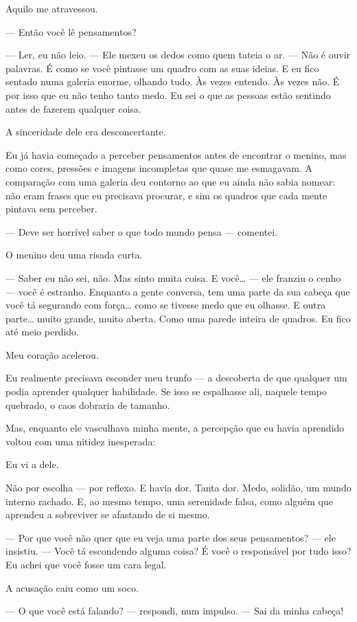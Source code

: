 Aquilo me atravessou.

— Então você lê pensamentos?

— Ler, eu não leio. — Ele mexeu os dedos como quem tateia o ar. — Não é ouvir palavras. É como se você pintasse um quadro com as suas ideias. E eu fico sentado numa galeria enorme, olhando tudo. Às vezes entendo. Às vezes não.  
É por isso que eu não tenho tanto medo. Eu sei o que as pessoas estão sentindo antes de fazerem qualquer coisa.

A sinceridade dele era desconcertante.

Eu já havia começado a perceber pensamentos antes de encontrar o menino, mas como cores, pressões e imagens incompletas que quase me esmagavam. A comparação com uma galeria deu contorno ao que eu ainda não sabia nomear: não eram frases que eu precisava procurar, e sim os quadros que cada mente pintava sem perceber.

— Deve ser horrível saber o que todo mundo pensa — comentei.

O menino deu uma risada curta.

— Saber eu não sei, não. Mas sinto muita coisa.  
E você… — ele franziu o cenho — você é estranho.  
Enquanto a gente conversa, tem uma parte da sua cabeça que você tá segurando com força… como se tivesse medo que eu olhasse.  
E outra parte… muito grande, muito aberta. Como uma parede inteira de quadros.  
Eu fico até meio perdido.

Meu coração acelerou.

Eu realmente precisava esconder meu trunfo — a descoberta de que qualquer um podia aprender qualquer habilidade.  
Se isso se espalhasse ali, naquele tempo quebrado, o caos dobraria de tamanho.

Mas, enquanto ele vasculhava minha mente, a percepção que eu havia aprendido voltou com uma nitidez inesperada:

Eu vi a dele.

Não por escolha — por reflexo.  
E havia dor.  
Tanta dor.  
Medo, solidão, um mundo interno rachado. E, ao mesmo tempo, uma serenidade falsa, como alguém que aprendeu a sobreviver se afastando de si mesmo.

— Por que você não quer que eu veja uma parte dos seus pensamentos? — ele insistiu. — Você tá escondendo alguma coisa? É você o responsável por tudo isso? Eu achei que você fosse um cara legal.

A acusação caiu como um soco.

— O que você está falando? — respondi, num impulso. — Sai da minha cabeça!

